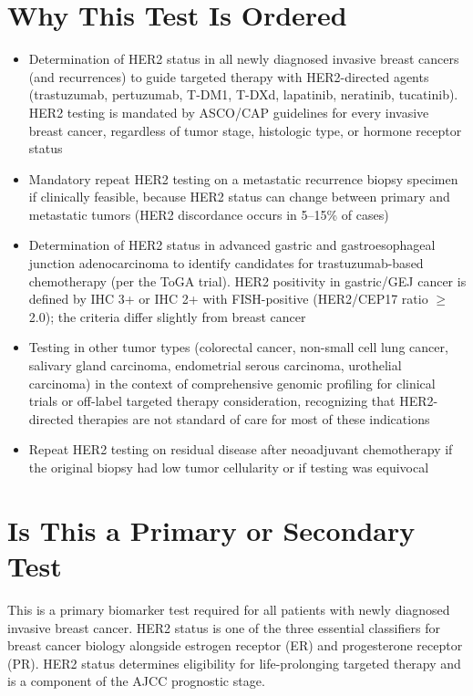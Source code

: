 \section*{Why This Test Is Ordered}
\begin{itemize}
  \item Determination of HER2 status in all newly diagnosed invasive breast cancers (and recurrences) to guide targeted therapy with HER2-directed agents (trastuzumab, pertuzumab, T-DM1, T-DXd, lapatinib, neratinib, tucatinib). HER2 testing is mandated by ASCO/CAP guidelines for every invasive breast cancer, regardless of tumor stage, histologic type, or hormone receptor status
  \item Mandatory repeat HER2 testing on a metastatic recurrence biopsy specimen if clinically feasible, because HER2 status can change between primary and metastatic tumors (HER2 discordance occurs in 5--15\% of cases)
  \item Determination of HER2 status in advanced gastric and gastroesophageal junction adenocarcinoma to identify candidates for trastuzumab-based chemotherapy (per the ToGA trial). HER2 positivity in gastric/GEJ cancer is defined by IHC 3+ or IHC 2+ with FISH-positive (HER2/CEP17 ratio $\geq$2.0); the criteria differ slightly from breast cancer
  \item Testing in other tumor types (colorectal cancer, non-small cell lung cancer, salivary gland carcinoma, endometrial serous carcinoma, urothelial carcinoma) in the context of comprehensive genomic profiling for clinical trials or off-label targeted therapy consideration, recognizing that HER2-directed therapies are not standard of care for most of these indications
  \item Repeat HER2 testing on residual disease after neoadjuvant chemotherapy if the original biopsy had low tumor cellularity or if testing was equivocal
\end{itemize}

\section*{Is This a Primary or Secondary Test}
This is a primary biomarker test required for all patients with newly diagnosed invasive breast cancer. HER2 status is one of the three essential classifiers for breast cancer biology alongside estrogen receptor (ER) and progesterone receptor (PR). HER2 status determines eligibility for life-prolonging targeted therapy and is a component of the AJCC prognostic stage.

